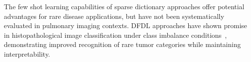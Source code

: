 The few shot learning capabilities of sparse dictionary approaches offer potential advantages for rare disease applications, but have
not been systematically evaluated in pulmonary imaging contexts. DFDL approaches have shown promise in histopathological image classification under class imbalance
conditions~\cite{dfdlhisto}, demonstrating improved recognition of rare tumor categories while maintaining interpretability.